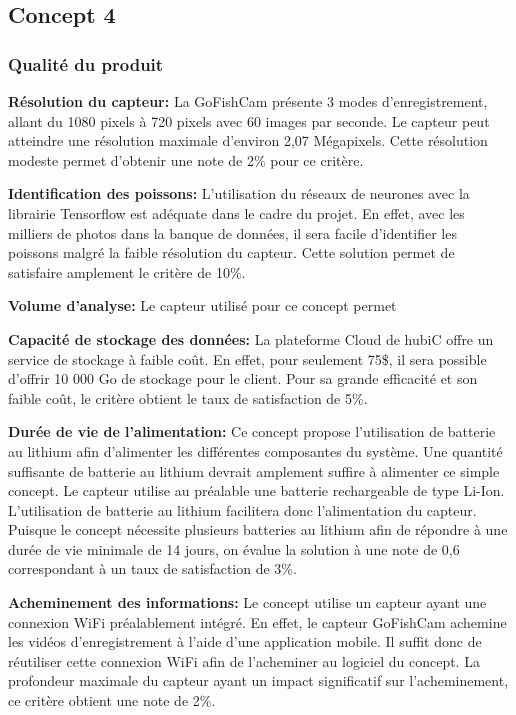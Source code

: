 \subsection{Concept 4}

\subsubsection{Qualité du produit}

\textbf{Résolution du capteur:} La GoFishCam présente 3 modes d'enregistrement, allant du 1080 pixels à 720 pixels avec 60 images par seconde. Le capteur peut atteindre une résolution maximale d'environ 2,07 Mégapixels. Cette résolution modeste permet d'obtenir une note de 2\% pour ce critère. \vspace{5mm}

\textbf{Identification des poissons:} L'utilisation du réseaux de neurones avec la librairie Tensorflow est adéquate dans le cadre du projet. En effet, avec les milliers de photos dans la banque de données, il sera facile d'identifier les poissons malgré la faible résolution du capteur. Cette solution permet de satisfaire amplement le critère de 10\%. \vspace{5mm}

\textbf{Volume d'analyse:} Le capteur utilisé pour ce concept permet 
\vspace{5mm}

\textbf{Capacité de stockage des données:} La plateforme Cloud de hubiC offre un service de stockage à faible coût. En effet, pour seulement 75\$, il sera possible d'offrir 10 000 Go de stockage pour le client. Pour sa grande efficacité et son faible coût, le critère obtient le taux de satisfaction de 5\%. \vspace{5mm}

\textbf{Durée de vie de l'alimentation:} Ce concept propose l'utilisation de batterie au lithium afin d'alimenter les différentes composantes du système. Une quantité suffisante de batterie au lithium devrait amplement suffire à alimenter ce simple concept. Le capteur utilise au préalable une batterie rechargeable de type Li-Ion. L'utilisation de batterie au lithium facilitera donc l'alimentation du capteur. Puisque le concept nécessite plusieurs batteries au lithium afin de répondre à une durée de vie minimale de 14 jours, on évalue la solution à une note de 0,6 correspondant à un taux de satisfaction de 3\%. \vspace{5mm}

\textbf{Acheminement des informations:} Le concept utilise un capteur ayant une connexion WiFi préalablement intégré. En effet, le capteur GoFishCam achemine les vidéos d'enregistrement à l'aide d'une application mobile. Il suffit donc de réutiliser cette connexion WiFi afin de l'acheminer au logiciel du concept. La profondeur maximale du capteur ayant un impact significatif sur l'acheminement, ce critère obtient une note de 2\%. \vspace{5mm}

